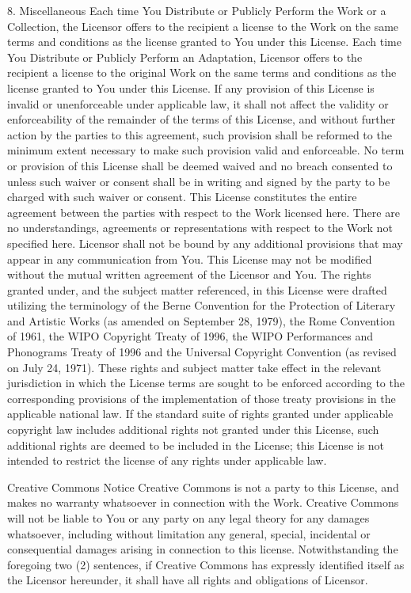 \documentclass[oneside]{book}
\begin{document}
8. Miscellaneous
Each time You Distribute or Publicly Perform the Work or a Collection, the
Licensor offers to the recipient a license to the Work on the same terms and
conditions as the license granted to You under this License.
Each time You Distribute or Publicly Perform an Adaptation, Licensor offers to
the recipient a license to the original Work on the same terms and conditions as
the license granted to You under this License.
If any provision of this License is invalid or unenforceable under applicable
law, it shall not affect the validity or enforceability of the remainder of the
terms of this License, and without further action by the parties to this
agreement, such provision shall be reformed to the minimum extent necessary to
make such provision valid and enforceable.
No term or provision of this License shall be deemed waived and no breach
consented to unless such waiver or consent shall be in writing and signed by the
party to be charged with such waiver or consent.
This License constitutes the entire agreement between the parties with respect
to the Work licensed here. There are no understandings, agreements or
representations with respect to the Work not specified here. Licensor shall not
be bound by any additional provisions that may appear in any communication from
You. This License may not be modified without the mutual written agreement of
the Licensor and You.
The rights granted under, and the subject matter referenced, in this License
were drafted utilizing the terminology of the Berne Convention for the
Protection of Literary and Artistic Works (as amended on September 28, 1979),
the Rome Convention of 1961, the WIPO Copyright Treaty of 1996, the WIPO
Performances and Phonograms Treaty of 1996 and the Universal Copyright
Convention (as revised on July 24, 1971). These rights and subject matter take
effect in the relevant jurisdiction in which the License terms are sought to be
enforced according to the corresponding provisions of the implementation of
those treaty provisions in the applicable national law. If the standard suite of
rights granted under applicable copyright law includes additional rights not
granted under this License, such additional rights are deemed to be included in
the License; this License is not intended to restrict the license of any rights
under applicable law.

Creative Commons Notice
Creative Commons is not a party to this License, and makes no warranty
whatsoever in connection with the Work. Creative Commons will not be liable to
You or any party on any legal theory for any damages whatsoever, including
without limitation any general, special, incidental or consequential damages
arising in connection to this license. Notwithstanding the foregoing two (2)
sentences, if Creative Commons has expressly identified itself as the Licensor
hereunder, it shall have all rights and obligations of Licensor.
\end{document}

